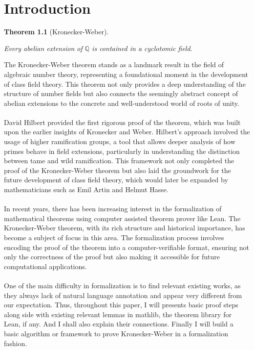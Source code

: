 \chapter{Introduction}
\label{cp:introduction}
\newtheorem{thm}{Theorem}[chapter]
\begin{thm}[Kronecker-Weber]\label{thm:kwthm}
~\begin{center}
    Every abelian extension of $\mathbb{Q}$ is contained in a cyclotomic field.
\end{center}
\end{thm}
\noindent
The Kronecker-Weber theorem stands as a landmark result in the field of algebraic number theory, representing a foundational moment in the development of class field theory. This theorem not only provides a deep understanding of the structure of number fields but also connects the seemingly abstract concept of abelian extensions to the concrete and well-understood world of roots of unity.\\\\
David Hilbert provided the first rigorous proof of the theorem, which was built upon the earlier insights of Kronecker and Weber. Hilbert’s approach involved the usage of higher ramification groups, a tool that allows deeper analysis of how primes behave in field extensions, particularly in understanding the distinction between tame and wild ramification. This framework not only completed the proof of the Kronecker-Weber theorem but also laid the groundwork for the future development of class field theory, which would later be expanded by mathematicians such as Emil Artin and Helmut Hasse.\\\\
In recent years, there has been increasing interest in the formalization of mathematical theorems using computer assisted theorem prover like Lean. The Kronecker-Weber theorem, with its rich structure and historical importance, has become a subject of focus in this area. The formalization process involves encoding the proof of the theorem into a computer-verifiable format, ensuring not only the correctness of the proof but also making it accessible for future computational applications.\\\\
One of the main difficulty in formalization is to find relevant existing works, as they always lack of natural language annotation and appear very different from our expectation. Thus, throughout this paper, I will presents basic proof steps along side with existing relevant lemmas in mathlib, the theorem library for Lean, if any. And I shall also explain their connections. Finally I will build a basic algorithm or framework to prove Kronecker-Weber in a formalization fashion.